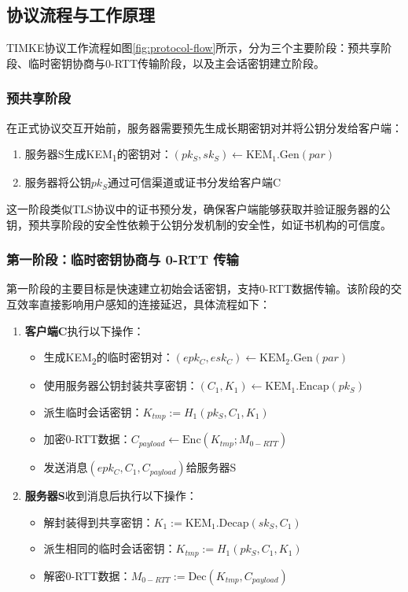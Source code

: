 \subsection{协议流程与工作原理}

TIMKE协议工作流程如图\ref{fig:protocol-flow}所示，分为三个主要阶段：预共享阶段、临时密钥协商与0-RTT传输阶段，以及主会话密钥建立阶段。

\subsubsection{预共享阶段}
在正式协议交互开始前，服务器需要预先生成长期密钥对并将公钥分发给客户端：

\begin{enumerate}
    \item 服务器S生成KEM\textsubscript{1}的密钥对：$(pk_S, sk_S) \leftarrow \text{KEM}_1.\text{Gen}(par)$
    \item 服务器将公钥$pk_S$通过可信渠道或证书分发给客户端C
\end{enumerate}

这一阶段类似TLS协议中的证书预分发，确保客户端能够获取并验证服务器的公钥，预共享阶段的安全性依赖于公钥分发机制的安全性，如证书机构的可信度。

\subsubsection{第一阶段：临时密钥协商与 0-RTT 传输}

第一阶段的主要目标是快速建立初始会话密钥，支持0-RTT数据传输。该阶段的交互效率直接影响用户感知的连接延迟，具体流程如下：

\begin{enumerate}
    \item \textbf{客户端C}执行以下操作：
    \begin{itemize}
        \item 生成KEM\textsubscript{2}的临时密钥对：$(epk_C, esk_C) \leftarrow \text{KEM}_2.\text{Gen}(par)$
        \item 使用服务器公钥封装共享密钥：$(C_1, K_1) \leftarrow \text{KEM}_1.\text{Encap}(pk_S)$
        \item 派生临时会话密钥：$K_{tmp} := H_1(pk_S, C_1, K_1)$
        \item 加密0-RTT数据：$C_{payload} \leftarrow \text{Enc}(K_{tmp}; M_{0-RTT})$
        \item 发送消息$(epk_C, C_1, C_{payload})$给服务器S
    \end{itemize}

    \item \textbf{服务器S}收到消息后执行以下操作：
    \begin{itemize}
        \item 解封装得到共享密钥：$K_1 := \text{KEM}_1.\text{Decap}(sk_S, C_1)$
        \item 派生相同的临时会话密钥：$K_{tmp} := H_1(pk_S, C_1, K_1)$
        \item 解密0-RTT数据：$M_{0-RTT} := \text{Dec}(K_{tmp}, C_{payload})$
    \end{itemize}
\end{enumerate}

